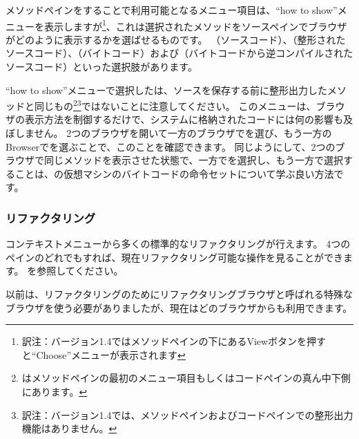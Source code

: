 \documentclass[a4paper,10pt,twoside]{book}
\begin{document}
メソッドペインを\actclick することで利用可能となるメニュー項目は、``how to show''メニューを表示しますが\footnote{訳注：バージョン1.4ではメソッドペインの下にあるViewボタンを押すと``Choose''メニューが表示されます}、これは選択されたメソッドをソースペインでブラウザがどのように表示するかを選ばせるものです。 （ソースコード）、（整形されたソースコード）、（バイトコード）および（バイトコードから逆コンパイルされたソースコード）といった選択肢があります。

``how to show''メニューで選択したは、ソースを保存する前に整形出力したメソッドと同じもの\footnote{はメソッドペインの最初のメニュー項目もしくはコードペインの真ん中下側にあります。}\footnote{訳注：バージョン1.4では、メソッドペインおよびコードペインでの整形出力機能はありません。}ではないことに注意してください。
このメニューは、ブラウザの表示方法を制御するだけで、システムに格納されたコードには何の影響も及ぼしません。
2つのブラウザを開いて一方のブラウザでを選び、もう一方のBrowserでを選ぶことで、このことを確認できます。
同じようにして、2つのブラウザで同じメソッドを表示させた状態で、一方でを選択し、もう一方で選択することは、\pharo の仮想マシンのバイトコードの命令セットについて学ぶ良い方法です。

\subsubsection{リファクタリング}

コンテキストメニューから多くの標準的なリファクタリングが行えます。
4つのペインのどれでも\actclick すれば、現在リファクタリング可能な操作を見ることができます。
を参照してください。

以前は、リファクタリングのためにリファクタリングブラウザと呼ばれる特殊なブラウザを使う必要がありましたが、現在はどのブラウザからも利用できます。
\end{document}

